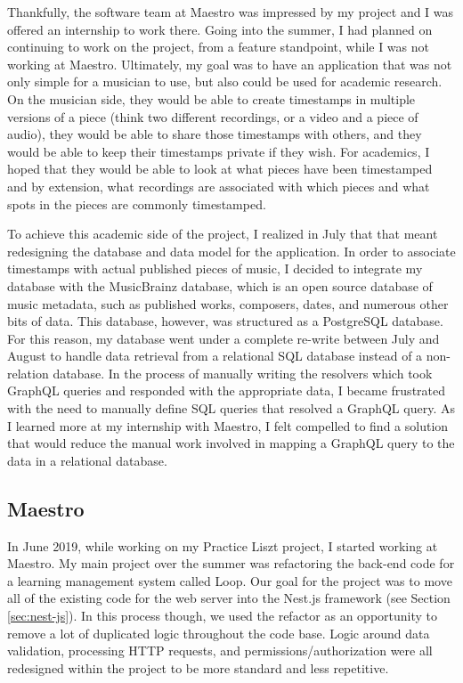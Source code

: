 Thankfully, the software team at Maestro was impressed by my project and I was offered an internship to work there. Going into the summer, I had planned on continuing to work on the project, from a feature standpoint, while I was not working at Maestro.  Ultimately, my goal was to have an application that was not only simple for a musician to use, but also could be used for academic research. On the musician side, they would be able to create timestamps in multiple versions of a piece (think two different recordings, or a video and a piece of audio), they would be able to share those timestamps with others, and they would be able to keep their timestamps private if they wish.  For academics, I hoped that they would be able to look at what pieces have been timestamped and by extension, what recordings are associated with which pieces and what spots in the pieces are commonly timestamped.

To achieve this academic side of the project, I realized in July that that meant redesigning the database and data model for the application.  In order to associate timestamps with actual published pieces of music, I decided to integrate my database with the MusicBrainz database, which is an open source database of music metadata, such as published works, composers, dates, and numerous other bits of data.  This database, however, was structured as a PostgreSQL database.  For this reason, my database went under a complete re-write between July and August to handle data retrieval from a relational SQL database instead of a non-relation database.  In the process of manually writing the resolvers which took GraphQL queries and responded with the appropriate data, I became frustrated with the need to manually define SQL queries that resolved a GraphQL query.  As I learned more at my internship with Maestro, I felt compelled to find a solution that would reduce the manual work involved in mapping a GraphQL query to the data in a relational database.

\subsection{Maestro}
In June 2019, while working on my Practice Liszt project, I started working at Maestro. My main project over the summer was refactoring the back-end code for a learning management system called Loop.  Our goal  for the project was to move all of the existing code for the web server into the Nest.js framework (see Section \ref{sec:nest-js}).  In this process though, we used the refactor as an opportunity to remove a lot of duplicated logic throughout the code base.  Logic around data validation, processing HTTP requests, and permissions/authorization were all redesigned within the project to be more standard and less repetitive.

